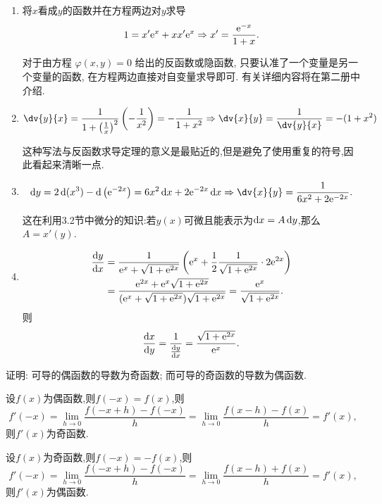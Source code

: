 \begin{solution}
    \begin{enumerate}
        \item 将$x$看成$y$的函数并在方程两边对$y$求导
              $$1 = x'\mathrm{e}^x + x x' \mathrm{e}^x \Rightarrow x' = \frac{\mathrm{e}^{-x}}{1+x}.$$
              \begin{remark}
                  对于由方程 $\varphi(x,y) = 0$ 给出的反函数或隐函数, 只要认准了一个变量是另一个变量的函数, 在方程两边直接对自变量求导即可. 有关详细内容将在第二册中介绍.
              \end{remark}
        \item $$\dv{y}{x} = \frac{1}{1+ \left(\frac{1}{x}\right)^2} \left( - \frac{1}{x^2} \right) = - \frac{1}{1+x^2} \Rightarrow \dv{x}{y} =
                  \frac{1}{\dv{y}{x}} = -(1+x^2)$$
              \begin{remark}
                  这种写法与反函数求导定理的意义是最贴近的,但是避免了使用重复的符号,因此看起来清晰一点.
              \end{remark}
        \item $$\dif y = 2 \diff(x^3) - \diff\left(\e^{-2x} \right) = 6x^2 \dif x + 2\e^{-2x} \dif x \Rightarrow \dv{x}{y} = \frac{1}{6x^2 + 2\e^{-2x}}.$$
              \begin{remark}
                  这在利用3.2节中微分的知识:若$y(x)$可微且能表示为$\operatorname{d\!} x = A \operatorname{d\!} y$,那么$A=x'(y)$.
              \end{remark}
        \item \begin{align*}
                  \dfrac{\operatorname{d\!} y}{\operatorname{d\!} x} & = \dfrac{1}{\mathrm{e}^x + \sqrt{1+\mathrm{e}^{2x}}} \left( \mathrm{e}^x + \dfrac{1}{2} \dfrac{1}{\sqrt{1+\mathrm{e}^{2x}}} \cdot 2\mathrm{e}^{2x} \right)     \\
                                         & = \dfrac{\mathrm{e}^{2x} + \mathrm{e}^x \sqrt{1+\mathrm{e}^{2x}}}{(\mathrm{e}^x + \sqrt{1+\mathrm{e}^{2x}})\sqrt{1+\mathrm{e}^{2x}}} = \dfrac{\mathrm{e}^x}{\sqrt{1+\mathrm{e}^{2x}}}.
              \end{align*}
              则$$\dfrac{\operatorname{d\!} x}{\operatorname{d\!} y} = \dfrac{1}{\frac{\operatorname{d\!} y}{\operatorname{d\!} x}} = \dfrac{\sqrt{1+\mathrm{e}^{2x}}}{\mathrm{e}^x}.$$
    \end{enumerate}
\end{solution}

\begin{exercise}[3.1.15]
    证明: 可导的偶函数的导数为奇函数; 而可导的奇函数的导数为偶函数.
\end{exercise}

\begin{solution}
    设$f(x)$为偶函数,则$f(-x) = f(x)$,则$$f'(-x) = \lim_{h \to 0} \dfrac{f(-x+h) - f(-x)}{h} = \lim_{h \to 0} \dfrac{f(x-h) - f(x)}{h} = f'(x),$$则$f'(x)$为奇函数.

    设$f(x)$为奇函数,则$f(-x) = -f(x)$,则$$f'(-x) = \lim_{h \to 0} \dfrac{f(-x+h) - f(-x)}{h} = \lim_{h \to 0} \dfrac{f(x-h) + f(x)}{h} = f'(x),$$则$f'(x)$为偶函数.
\end{solution}

